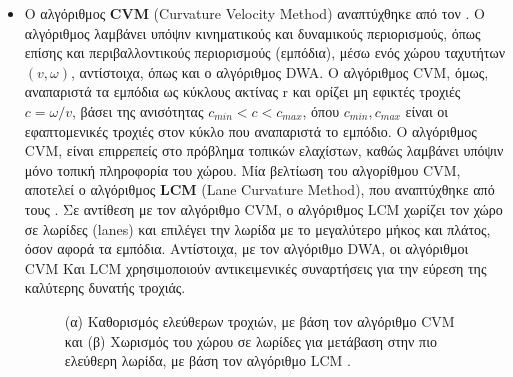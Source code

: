 \begin{itemize}
\item Ο αλγόριθμος \textbf{CVM} (Curvature Velocity Method) αναπτύχθηκε από τον \citeauthor{cvm} \cite{cvm}. Ο αλγόριθμος λαμβάνει υπόψιν κινηματικούς και δυναμικούς περιορισμούς, όπως επίσης και περιβαλλοντικούς περιορισμούς (εμπόδια), μέσω ενός χώρου ταχυτήτων $(v,\omega)$, αντίστοιχα, όπως και ο αλγόριθμος DWA. Ο αλγόριθμος CVM, όμως, αναπαριστά τα εμπόδια ως κύκλους ακτίνας r και ορίζει μη εφικτές τροχιές $c=\omega/v$, βάσει της ανισότητας $c_{min}<c<c_{max}$, όπου $c_{min}, c_{max}$ είναι οι εφαπτομενικές τροχιές στον κύκλο που αναπαριστά το εμπόδιο. Ο αλγόριθμος CVM, είναι επιρρεπείς στο πρόβλημα τοπικών ελαχίστων, καθώς λαμβάνει υπόψιν μόνο τοπική πληροφορία του χώρου. Μία βελτίωση του αλγορίθμου CVM, αποτελεί ο αλγόριθμος \textbf{LCM} (Lane Curvature Method), που αναπτύχθηκε από τους \citeauthor{lcm} \cite{lcm}. Σε αντίθεση με τον αλγόριθμο CVM, ο αλγόριθμος LCM χωρίζει τον χώρο σε λωρίδες (lanes) και επιλέγει την λωρίδα με το μεγαλύτερο μήκος και πλάτος, όσον αφορά τα εμπόδια. Αντίστοιχα, με τον αλγόριθμο DWA, οι αλγόριθμοι CVM Και LCM χρησιμοποιούν αντικειμενικές συναρτήσεις για την εύρεση της καλύτερης δυνατής τροχιάς.

\begin{figure}[!ht]
	\centering
	\caption[(α) Καθορισμός ελεύθερων τροχιών, με βάση τον αλγόριθμο CVM και (β) Χωρισμός του χώρου σε λωρίδες για μετάβαση στην πιο ελεύθερη λωρίδα, με βάση τον αλγόριθμο LCM.]{(α) Καθορισμός ελεύθερων τροχιών, με βάση τον αλγόριθμο CVM \cite{cvm} και (β) Χωρισμός του χώρου σε λωρίδες για μετάβαση στην πιο ελεύθερη λωρίδα, με βάση τον αλγόριθμο LCM \cite{lcm}.}
	\label{fig:cvm_and_lcm}
\end{figure}

\end{itemize}

